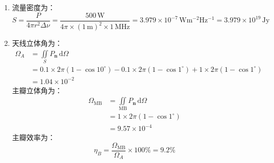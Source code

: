 \documentclass[a4paper]{article}
\renewcommand\bm\symbf
\begin{document}
\begin{enumerate}
\begin{center}
    \end{center}
    天线的总功率为：
    \[
        P = \frac{\mu_0\pi c}{12}\left(\frac{I_0l}{\lambda}\right)^2
    \]
    方向增益为：
    \[
        G_{\bm{n}}(\theta,\phi) = \frac{4\pi P_{\bm{n}}}{P} = \frac{3}{2}\sin^2\theta
    \]
    方向系数$D=G_{max}=\dfrac{3}{2}$，以$\mathrm{dB}$为单位表示为：
    \[
        D_{\mathrm{dB}} = 10\lg\frac{3}{2} = 1.761\,\mathrm{dB}
    \]
    天线立体角为：
    \[
        \Omega_A = \frac{4\pi}{G_{max}} = \iint\limits_{S}P_{\bm{n}}\,\mathrm{d}\Omega = \frac{8\pi}{3}
    \]

    \bigskip
    \item[3.]
    流量密度为：
    \[
        S = \frac{P}{4\pi r^2\Delta\nu} = \frac{500\,\mathrm{W}}{4\pi\times(1\,\mathrm{m})^2\times1\,\mathrm{MHz}} = 3.979\times10^{-7}\,\mathrm{Wm^{-2}Hz^{-1}} = 3.979\times10^{19}\,\mathrm{Jy}
    \]

    \bigskip
    \item[4.]
    天线立体角为：
    \begin{align*}
        \Omega_A
        &= \iint\limits_{S}P_{\bm{n}}\,\mathrm{d}\Omega \\
        &= 0.1\times2\pi(1-\cos10^\circ) - 0.1\times2\pi(1-\cos1^\circ) + 1\times2\pi(1-\cos1^\circ) \\
        &= 1.04\times10^{-2}
    \end{align*}
    主瓣立体角为：
    \begin{align*}
        \Omega_\mathrm{MB}
        &= \iint\limits_\mathrm{MB}P_{\bm{n}}\,\mathrm{d}\Omega \\
        &= 1\times2\pi(1-\cos1^\circ) \\
        &= 9.57\times10^{-4}
    \end{align*}
    主瓣效率为：
    \[
        \eta_{B} = \frac{\Omega_\mathrm{MB}}{\Omega_A}\times100\% = 9.2\%
    \]

\end{enumerate}
\end{document}
